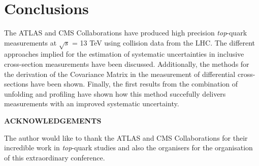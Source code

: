 \documentclass[12pt]{article}
\def\Acknowledgements{\bigskip  \bigskip \begin{center} \begin{large}
             \bf ACKNOWLEDGEMENTS \end{large}\end{center}}
\begin{document}
\section{Conclusions}
The ATLAS and CMS Collaborations have produced high precision \emph{top}-quark measurements at $\sqrt{s}$ = 13 TeV using collision data from the LHC. The different approaches implied for the estimation of systematic uncertainties in inclusive cross-section measurements have been discussed. Additionally, the methods for the derivation of the Covariance Matrix in the measurement of differential cross-sections have been shown. Finally, the first results from the combination of unfolding and profiling have shown how this method succefully delivers measurements with an improved systematic uncertainty.






\Acknowledgements
The author would like to thank the ATLAS and CMS Collaborations for their incredible work in \emph{top}-quark studies and also the organisers for the organisation of this extraordinary conference.
\end{document}

